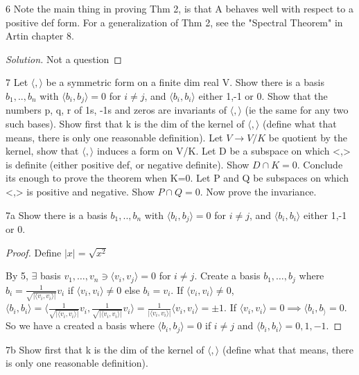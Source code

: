 \documentclass{article}
\newcommand{\abs}[1]{\lvert #1\rvert}
\newcommand{\angles}[1]{\langle #1 \rangle}
\newenvironment{solution}
{\renewcommand\qedsymbol{$\blacksquare$}\begin{proof}[Solution]}
{\end{proof}}
\begin{document}
\bigskip

\begin{PROB}{6}\label{Problem 6.}
    Note the main thing in proving Thm 2, is that A behaves well with respect to a positive def form. For a generalization of Thm 2, see the "Spectral Theorem" in Artin chapter 8.
\end{PROB}
\begin{solution}
    Not a question
\end{solution}

\bigskip

\begin{PROB}{7}\label{Problem 7.}
    Let $\angles{,}$ be a symmetric form on a finite dim real V. Show there is a basis $b_1,..,b_n$ with $\angles{b_i,b_j} = 0$ for $i \neq j$, and $\angles{b_i,b_i}$  either 1,-1 or 0.  Show that the numbers p, q, r of 1s, -1s and zeros are invariants of $\angles{ , }$  (ie the same for any two such bases). Show first that k is the dim of the kernel of $\angles{,}$  (define what that means, there is only one reasonable definition). Let $V \to V/K$ be quotient by the kernel, show that $\angles{,}$  induces a form on V/K.  Let D be a subspace on which <,> is definite (either positive def, or negative definite). Show $D \cap K = 0$. Conclude its enough to prove the theorem when K=0. Let P and Q be subspaces on which <,> is positive and negative. Show $P \cap Q = 0$. Now prove the invariance. 
\end{PROB}
\begin{claim}{7a}\label{Claim 7a.}
    Show there is a basis $b_1,..,b_n$ with $\angles{b_i,b_j} = 0$ for $i \neq j$, and $\angles{b_i,b_i}$  either 1,-1 or 0.
\end{claim}
\begin{proof}
    Define $\abs{x} = \sqrt{x^2}$


    By 5, $\exists$ basis $v_1, \dots, v_n \ni \angles{v_i, v_j} = 0$ for $i \neq j$. Create a basis $b_1, \dots, b_j$ where $b_i = \frac{1}{\sqrt{\abs{\angles{v_i, v_i}}}}v_i$ if $\angles{v_i, v_i} \neq 0$ else $b_i = v_i$. If $\angles{v_i, v_i} \neq 0$, $\angles{b_i, b_i} = \angles{\frac{1}{\sqrt{\abs{\angles{v_i, v_i}}}}v_i, \frac{1}{\sqrt{\abs{\angles{v_i, v_i}}}}v_i} = \frac{1}{\abs{\angles{v_i, v_i}}}\angles{v_i, v_i} = \pm 1$. If $\angles{v_i, v_i} = 0 \implies \angles{b_i, b_} = 0$. So we have a created a basis where $\angles{b_i, b_j} = 0$ if $i \neq j$ and $\angles{b_i, b_i} = 0, 1, -1$.             
\end{proof}
\begin{claim}{7b}\label{Claim 7b.}
    Show first that k is the dim of the kernel of $\angles{,}$  (define what that means, there is only one reasonable definition).
\end{claim}
\end{document}
